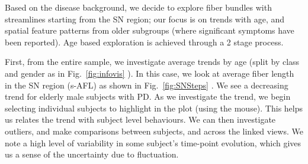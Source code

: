 \noindent Based on the disease background,
we decide to explore fiber bundles with streamlines starting from the SN region; our focus is on trends with age, and spatial feature patterns from older subgroups (where significant symptoms have been reported). Age based exploration is achieved through a 2 stage process.  

First, from the entire sample, we investigate average trends by age (split by class and gender as in Fig.~\ref{fig:infovis} ). In this case, we look at average fiber length in the SN region (s-AFL) as shown in Fig.~\ref{fig:SNSteps} . We see a decreasing trend for elderly male subjects with PD. As we investigate the trend, we begin selecting individual subjects to highlight in the plot (using the mouse). This helps us relates the trend with subject level behaviours. We can then investigate outliers, and make comparisons between subjects, and across the linked views. We note a high level of variability in some subject's time-point evolution, which gives us a sense of the uncertainty due to fluctuation.

